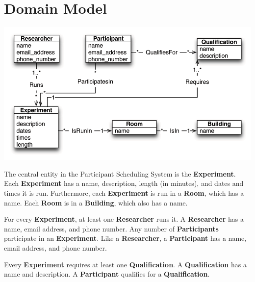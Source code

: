 \clearpage
\section{Domain Model}
\includegraphics[width=7in]{../other/domain-model/domain-model}

The central entity in the Participant Scheduling System is the
\textbf{Experiment}. Each \textbf{Experiment} has a name, description,
length (in minutes), and dates and times it is run. Furthermore, each
\textbf{Experiment} is run in a \textbf{Room}, which has a name. Each
\textbf{Room} is in a \textbf{Building}, which also has a name.

For every \textbf{Experiment}, at least one \textbf{Researcher} runs
it. A \textbf{Researcher} has a name, email address, and phone number.
Any number of \textbf{Participants} participate in an
\textbf{Experiment}. Like a \textbf{Researcher}, a
\textbf{Participant} has a name, email address, and phone number.

Every \textbf{Experiment} requires at least one
\textbf{Qualification}. A \textbf{Qualification} has a name and
description. A \textbf{Participant} qualifies for a
\textbf{Qualification}.
